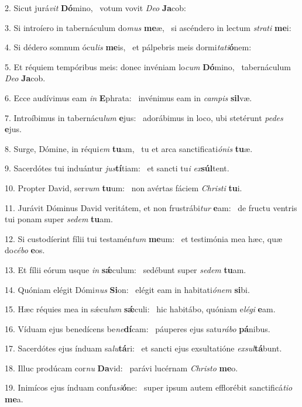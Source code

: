 2. Sicut jurá\textit{vit} \textbf{Dó}mino, \ast\  votum vovit \textit{De}\textit{o} \textbf{Ja}cob:\

3. Si introíero in tabernáculum do\textit{mus} \textbf{me}æ, \ast\  si ascéndero in lectum \textit{stra}\textit{ti} \textbf{me}i:\

4. Si dédero somnum ócu\textit{lis} \textbf{me}is, \ast\  et pálpebris meis dormi\textit{ta}\textit{ti}\textbf{ó}nem:\

5. Et réquiem tempóribus meis: donec invéniam lo\textit{cum} \textbf{Dó}mino, \ast\  tabernáculum \textit{De}\textit{o} \textbf{Ja}cob.\

6. Ecce audívimus eam \textit{in} \textbf{E}phrata: \ast\  invénimus eam in \textit{cam}\textit{pis} \textbf{sil}væ.\

7. Introíbimus in tabernácu\textit{lum} \textbf{e}jus: \ast\  adorábimus in loco, ubi stetérunt \textit{pe}\textit{des} \textbf{e}jus.\

8. Surge, Dómine, in réqui\textit{em} \textbf{tu}am, \ast\  tu et arca sanctificati\textit{ó}\textit{nis} \textbf{tu}æ.\

9. Sacerdótes tui induántur \textit{jus}\textbf{tí}tiam: \ast\  et sancti tu\textit{i} \textit{ex}\textbf{súl}tent.\

10. Propter David, ser\textit{vum} \textbf{tu}um: \ast\  non avértas fáciem \textit{Chris}\textit{ti} \textbf{tu}i.\

11. Jurávit Dóminus David veritátem, et non frustrábi\textit{tur} \textbf{e}am: \ast\  de fructu ventris tui ponam super \textit{se}\textit{dem} \textbf{tu}am.\

12. Si custodíerint fílii tui testamén\textit{tum} \textbf{me}um: \ast\  et testimónia mea hæc, quæ do\textit{cé}\textit{bo} \textbf{e}os.\

13. Et fílii eórum usque \textit{in} \textbf{sǽ}culum: \ast\  sedébunt super \textit{se}\textit{dem} \textbf{tu}am.\

14. Quóniam elégit Dómi\textit{nus} \textbf{Si}on: \ast\  elégit eam in habitati\textit{ó}\textit{nem} \textbf{si}bi.\

15. Hæc réquies mea in sǽcu\textit{lum} \textbf{sǽ}culi: \ast\  hic habitábo, quóniam e\textit{lé}\textit{gi} \textbf{e}am.\

16. Víduam ejus benedícens be\textit{ne}\textbf{dí}cam: \ast\  páuperes ejus satu\textit{rá}\textit{bo} \textbf{pá}nibus.\

17. Sacerdótes ejus índuam sa\textit{lu}\textbf{tá}ri: \ast\  et sancti ejus exsultatióne \textit{ex}\textit{sul}\textbf{tá}bunt.\

18. Illuc prodúcam cor\textit{nu} \textbf{Da}vid: \ast\  parávi lucérnam \textit{Chris}\textit{to} \textbf{me}o.\

19. Inimícos ejus índuam confu\textit{si}\textbf{ó}ne: \ast\  super ipsum autem efflorébit sanctificá\textit{ti}\textit{o} \textbf{me}a.\

